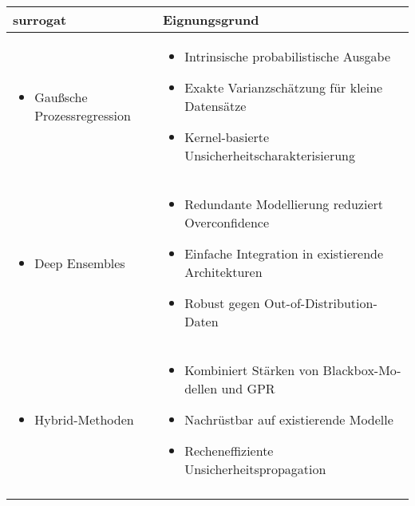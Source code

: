 \begin{otherlanguage}{ngerman}
\begin{table}[!htpb]
  \centering
  \begin{tabularx}{\textwidth}{|l|X|}
    \hline
    \textbf{\gls{surrogat}} & \textbf{Eignungsgrund} \\
    \hline
    \begin{itemize}[topsep=0em, itemsep=0em, left=0em, labelsep=0.25em]
      \item \gls{Gaußsche Prozessregression}
    \end{itemize} &  
    \begin{itemize}[topsep=0em, itemsep=0em, left=0em, labelsep=0.25em]
      \item Intrinsische probabilistische Ausgabe
      \item Exakte Varianzschätzung für kleine Datensätze
      \item Kernel-basierte Unsicherheitscharakterisierung
    \end{itemize} \\ 
    \hline
    \begin{itemize}[topsep=0em, itemsep=0em, left=0em, labelsep=0.25em]
      \item Deep Ensembles
    \end{itemize} & 
    \begin{itemize}[topsep=0em, itemsep=0em, left=0em, labelsep=0.25em]
      \item Redundante Modellierung reduziert Overconfidence
      \item Einfache Integration in existierende Architekturen
      \item Robust gegen Out-of-Distribution-Daten
    \end{itemize} \\
    \hline
    \begin{itemize}[topsep=0em, itemsep=0em, left=0em, labelsep=0.25em]
      \item Hybrid-Methoden
    \end{itemize} & 
    \begin{itemize}[topsep=0em, itemsep=0em, left=0em, labelsep=0.25em]
      \item Kombiniert Stärken von Blackbox-Modellen und GPR
      \item Nachrüstbar auf existierende Modelle
      \item Recheneffiziente Unsicherheitspropagation
    \end{itemize} \\
    \hline
    \begin{itemize}[topsep=0em, itemsep=0em, left=0em, labelsep=0.25em]

\end{itemize}
\end{tabularx}
\end{table}
\end{otherlanguage}
